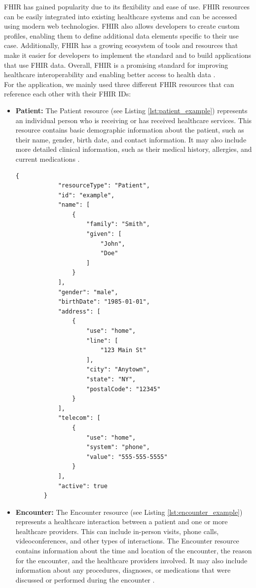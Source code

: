 \documentclass[]{report}
\begin{document}
FHIR has gained popularity due to its flexibility and ease of use. FHIR resources can be easily integrated into existing healthcare systems and can be accessed using modern web technologies. FHIR also allows developers to create custom profiles, enabling them to define additional data elements specific to their use case. Additionally, FHIR has a growing ecosystem of tools and resources that make it easier for developers to implement the standard and to build applications that use FHIR data. Overall, FHIR is a promising standard for improving healthcare interoperability and enabling better access to health data \cite{hl7-fhir}.\\
For the application, we mainly used three different FHIR resources that can reference each other with their FHIR IDs:
\begin{itemize}
    \item \textbf{Patient:} The Patient resource (see Listing \ref{lst:patient_example}) represents an individual person who is receiving or has received healthcare services. This resource contains basic demographic information about the patient, such as their name, gender, birth date, and contact information. It may also include more detailed clinical information, such as their medical history, allergies, and current medications \cite{hl7-fhir}. \begin{lstlisting}[style=json, label=lst:patient_example, caption={Example for a FHIR patient ressource}]
        {
            "resourceType": "Patient",
            "id": "example",
            "name": [
                {
                    "family": "Smith",
                    "given": [
                        "John",
                        "Doe"
                    ]
                }
            ],
            "gender": "male",
            "birthDate": "1985-01-01",
            "address": [
                {
                    "use": "home",
                    "line": [
                        "123 Main St"
                    ],
                    "city": "Anytown",
                    "state": "NY",
                    "postalCode": "12345"
                }
            ],
            "telecom": [
                {
                    "use": "home",
                    "system": "phone",
                    "value": "555-555-5555"
                }
            ],
            "active": true
        }
    \end{lstlisting}
    \item \textbf{Encounter:} The Encounter resource (see Listing \ref{lst:encounter_example}) represents a healthcare interaction between a patient and one or more healthcare providers. This can include in-person visits, phone calls, videoconferences, and other types of interactions. The Encounter resource contains information about the time and location of the encounter, the reason for the encounter, and the healthcare providers involved. It may also include information about any procedures, diagnoses, or medications that were discussed or performed during the encounter \cite{hl7-fhir}. \begin{lstlisting}[style=json, label=lst:encounter_example, caption={Example for a FHIR encounter ressource}]

\end{lstlisting}
\end{itemize}
\end{document}
